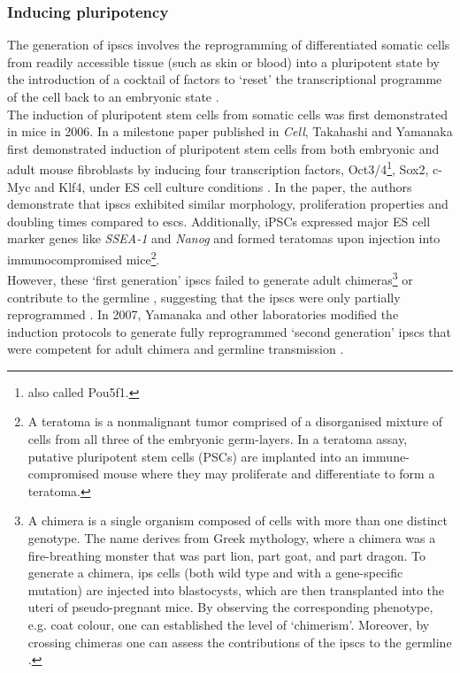\subsubsection{Inducing pluripotency}

The generation of \glspl{ipsc} involves the reprogramming of differentiated somatic cells from readily accessible tissue (such as skin or blood) into a pluripotent state by the introduction of a cocktail of factors to `reset' the transcriptional programme of the cell back to an embryonic state \cite{saha2009technical}. \\

The induction of pluripotent stem cells from somatic cells was first demonstrated in mice in 2006.
In a milestone paper published in \textit{Cell}, Takahashi and Yamanaka first demonstrated induction of pluripotent stem cells from both embryonic and adult mouse fibroblasts by inducing four transcription factors, Oct3/4\footnote{also called Pou5f1.}, Sox2, c-Myc and Klf4, under ES cell culture conditions \cite{takahashi2006induction}.
In the paper, the authors demonstrate that \glspl{ipsc} exhibited similar morphology, proliferation properties and doubling times compared to \glspl{esc}.
Additionally, iPSCs expressed major ES cell marker genes like \textit{SSEA-1} and \textit{Nanog} and formed teratomas upon injection into immunocompromised mice\footnote{A teratoma is a nonmalignant tumor comprised of a disorganised mixture of cells from all three of the embryonic germ-layers. 
In a teratoma assay, putative pluripotent stem cells (PSCs) are implanted into an immune-compromised mouse where they may proliferate and differentiate to form a teratoma. }.\\ 

However, these `first generation' \glspl{ipsc} failed to generate adult chimeras\footnote{A chimera is a single organism composed of cells with more than one distinct genotype.
The name derives from Greek mythology, where a chimera was a fire-breathing monster that was part lion, part goat, and part dragon. 
To generate a chimera, \gls{ips} cells (both wild type and with a gene-specific mutation) are injected into blastocysts, which are then transplanted into the uteri of pseudo-pregnant mice.
By observing the corresponding phenotype, e.g. coat colour, one can established the level of `chimerism'.
Moreover, by crossing chimeras one can assess the contributions of the \glspl{ipsc} to the germline \cite{okita2007generation}.} or contribute to the germline \cite{takahashi2006induction}, suggesting that the \glspl{ipsc} were only partially reprogrammed \cite{omole2018ten}. 
In 2007, Yamanaka and other laboratories modified the induction protocols to generate fully reprogrammed `second generation' \glspl{ipsc} that were competent for adult chimera and germline transmission \cite{maherali2007directly, wernig2007vitro, okita2007generation}.\\

